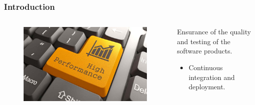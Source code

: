 \begin{frame}
    \frametitle{Introduction}
    \begin{columns}[T]
        \begin{column}{.48\textwidth}
            \begin{figure}[H]
                \includegraphics[width=\textwidth]{images/performance.jpg}
                \label{fig:performance}
            \end{figure}
        \end{column}
        \hfill
        \begin{column}{.48\textwidth}
            \begin{block}{}
                Ensurance of the quality and testing of the software products. 
            \end{block}
            \begin{itemize}
                \item<1-> Continuous integration and deployment.
            \end{itemize}
        \end{column}
    \end{columns}
\end{frame}

